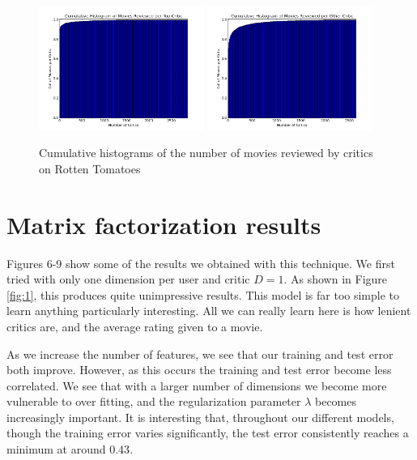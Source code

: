 \documentclass[12pt]{article}
\begin{document}
	\begin{figure}[H]
	    \centering
	    \includegraphics[width=0.48\textwidth]{plots/plot_r_crit_top.png}
	    \includegraphics[width=0.48\textwidth]{plots/plot_r_crit_oth.png}
	    \caption{Cumulative histograms of the number of movies reviewed by critics on Rotten Tomatoes}
	    \label{fig:r_crit}
	\end{figure}



\section{Matrix factorization results}

Figures 6-9 show some of the results we obtained with this technique. We first tried with only one dimension per user and critic $D=1$. As shown in Figure \ref{fig:1}, this produces quite unimpressive results. This model is far too simple to learn anything particularly interesting. All we can really learn here is how lenient critics are, and the average rating given to a movie.

As we increase the number of features, we see that our training and test error both improve. However, as this occurs the training and test error become less correlated. We see that with a larger number of dimensions we become more vulnerable to over fitting, and the regularization parameter $\lambda$ becomes increasingly important. It is interesting that, throughout our different models, though the training error varies significantly, the test error consistently reaches a minimum at around $0.43$. 
\end{document}
